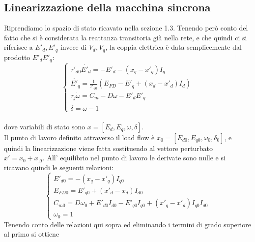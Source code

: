 \documentclass[Lau,noexaminfo]{sapthesis}
\begin{document}
	\subsection{Linearizzazione della macchina sincrona}
	Riprendiamo lo spazio di stato ricavato nella sezione 1.3. Tenendo però conto del fatto che si è considerata la reattanza transitoria già nella rete, e che quindi ci si riferisce a $E'_d, E'_q$ invece di $V_d,V_q$, la coppia elettrica è data semplicemente dal prodotto $E'_dE'_q$:\\
	\[
	\begin{cases}
	\tau'_{d0} \dot{E'_d}=-E'_d-(x_q-x'_q)I_q\\
	\dot{E'_q}=\frac{1}{\tau'_{d0}}(E_{FD}-E'_q+(x_d-x'_d)I_d)\\
	\tau_j\dot{\omega}=C_m-D\omega-E'_dE'_q\\
	\dot{\delta}=\omega-1
	\end{cases}
	\]\\
	dove variabili di stato sono $x=[E_d,E_q,\omega,\delta]$.\\
	Il punto di lavoro definito attraverso il load flow è $x_0=[E_{d0},E_{q0},\omega_0,\delta_0]$, e quindi la linearizzazione viene fatta sostituendo al vettore perturbato \\$x'=x_0+x_\Delta$. All' equilibrio nel punto di lavoro le derivate sono nulle e si ricavano quindi le seguenti relazioni:\\
	\[
	\begin{cases}
	E'_{d0}=-(x_q-x'_q)I_{q0}\\
	E_{FD0}=E'_{q0}+(x'_d-x_d)I_{d0}\\
	C_{m0}=D\omega_0+E'_{d0}I_{d0}-E'_{q0}I_{q0}+(x'_q-x'_d)I_{q0}I_{d0}\\
	\omega_0=1
	\end{cases}
	\]
	Tenendo conto delle relazioni qui sopra ed eliminando i termini di grado superiore al primo si ottiene
\end{document}
